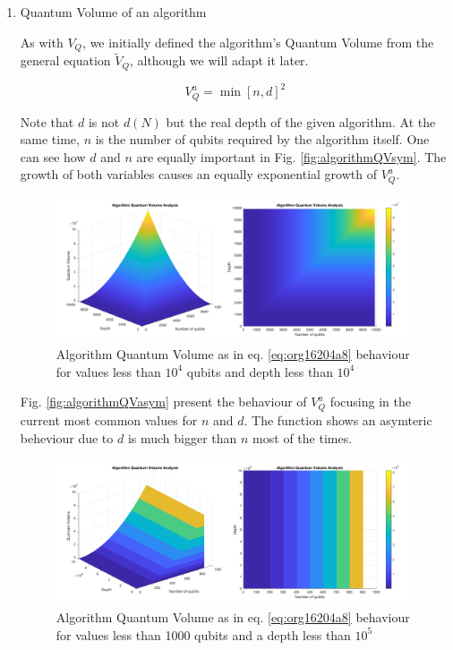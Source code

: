\begin{enumerate}
\begin{enumerate}
\begin{enumerate}
\item Quantum Volume of an algorithm
\label{sec:org6d90996}

As with \(V_Q\), we initially defined the algorithm's Quantum Volume from the general equation \(\tilde{V}_Q\), although we will adapt it later.

\begin{equation}
\label{eq:org16204a8}
V_Q^a = \min \left[ n,d \right]^2
\end{equation}

Note that \(d\) is not \(d(N)\) but the real depth of the given algorithm.
At the same time, \(n\) is the number of qubits required by the algorithm itself.
One can see how \(d\) and \(n\) are equally important in Fig. \ref{fig:algorithmQVsym}.
The growth of both variables causes an equally exponential growth of \(V^a_Q\).

\begin{figure}[htbp]
\centering
\includegraphics[width=\textwidth]{figures/V_q_analysis_sym.png}
\caption{\label{fig:orgd44147a}
Algorithm Quantum Volume as in eq. \ref{eq:org16204a8} behaviour for values less than \(10^{4}\) qubits and depth less than \(10^{4}\)}
\end{figure}

Fig. \ref{fig:algorithmQVasym} present the behaviour of \(V_Q^a\)
focusing in the current most common values for \(n\) and \(d\).
The function shows an asymteric beheviour due to \(d\) is much bigger than \(n\) most of the times.


\begin{figure}[htbp]
\centering
\includegraphics[width=\textwidth]{figures/V_q_analysis_asym.png}
\caption{\label{fig:orgcbd9c2d}
Algorithm Quantum Volume as in eq. \ref{eq:org16204a8} behaviour for values less than 1000 qubits and a depth less than \(10^{5}\)}
\end{figure}


\end{enumerate}
\end{enumerate}
\end{enumerate}
